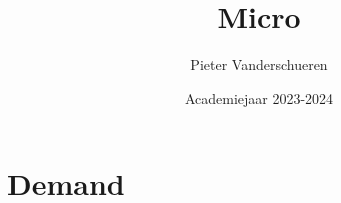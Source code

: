 \documentclass{exam} %
\title{Micro}
\author{Pieter Vanderschueren}
\date{Academiejaar 2023-2024}
\newcommand{\introPage}[1]{

    \vspace*{\fill}
    \begin{center}
        
    \section*{#1}
    \end{center}

    \vspace*{\fill}
}
\begin{document}
\begin{titlingpage}
\maketitle
\end{titlingpage}

\newpage




\newpage

\tableofcontents

\newpage


\section{Demand}

\vspace{0.5cm}


\end{document}
